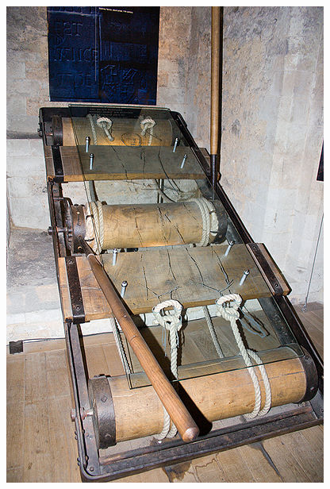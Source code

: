 \begin{frame}
\begin{minipage}{0.5\textwidth}
        \includegraphics[height=0.9\textheight]{img/rack.png}

\end{minipage}
\end{frame}
